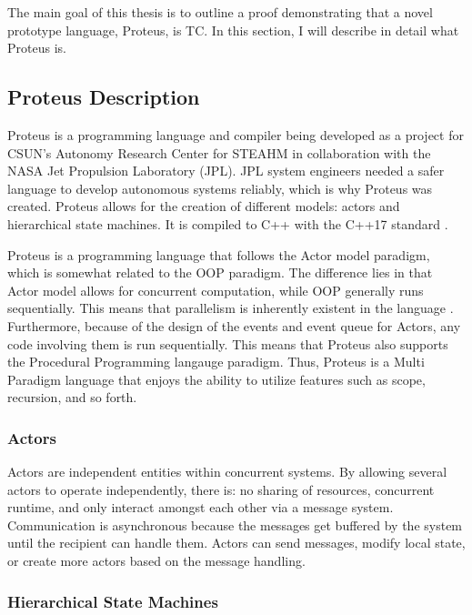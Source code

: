 The main goal of this thesis is to outline a proof demonstrating that a novel prototype language, Proteus, is TC.
In this section, I will describe in detail what Proteus is.

\subsection{Proteus Description}\label{subsec:ProteusDescription}

Proteus is a programming language and compiler being developed as a project for CSUN's Autonomy Research Center for STEAHM in collaboration with the NASA Jet Propulsion Laboratory (JPL).
JPL system engineers needed a safer language to develop autonomous systems reliably, which is why Proteus was created.
Proteus allows for the creation of different models: actors and hierarchical state machines.
It is compiled to C++ with the C++17 standard \cite{ProteusRunTime}.

Proteus is a programming language that follows the Actor model paradigm, which is somewhat related to the OOP paradigm.
The difference lies in that Actor model allows for concurrent computation, while OOP generally runs sequentially.
This means that parallelism is inherently existent in the language \cite{ActorModelParallel,ActorJavaParallel}.
Furthermore, because of the design of the events and event queue for Actors, any code involving them is run sequentially.
This means that Proteus also supports the Procedural Programming langauge paradigm.
Thus, Proteus is a Multi Paradigm language that enjoys the ability to utilize features such as scope, recursion, and so forth.

\subsubsection{Actors}\label{subsubsec:Actors}

Actors are independent entities within concurrent systems.
By allowing several actors to operate independently, there is: no sharing of resources, concurrent runtime, and only interact amongst each other via a message system.
Communication is asynchronous because the messages get buffered by the system until the recipient can handle them.
Actors can send messages, modify local state, or create more actors based on the message handling.

\subsubsection{Hierarchical State Machines}\label{subsubsec:HSM}

